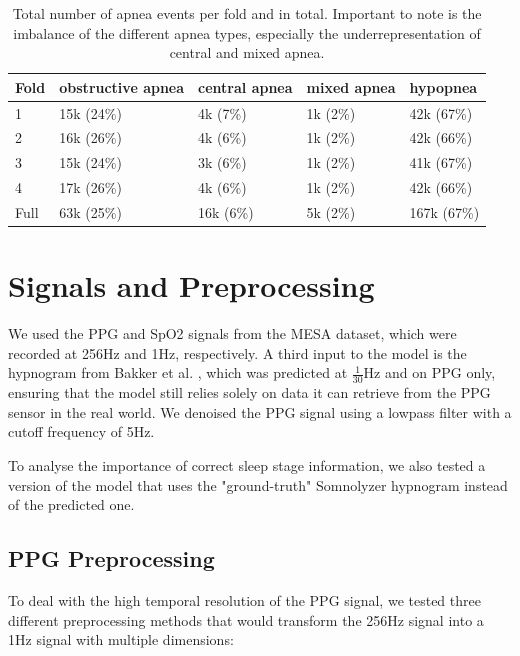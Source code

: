 \renewcommand{\arraystretch}{1.5}
\begin{table}
    \centering
    \begin{tabular}{p{1cm} p{1.7cm} p{1.7cm} p{1.7cm} p{1.8cm}}
        Fold & obstructive \newline apnea & central \newline apnea & mixed \newline apnea & hypopnea \\
        \hline
        1 & 15k (24\%) & 4k (7\%) & 1k (2\%) & 42k (67\%) \\
        2 & 16k (26\%) & 4k (6\%) & 1k (2\%) & 42k (66\%) \\
        3 & 15k (24\%) & 3k (6\%) & 1k (2\%) & 41k (67\%) \\
        4 & 17k (26\%) & 4k (6\%) & 1k (2\%) & 42k (66\%) \\
        \hline
        Full & 63k (25\%) & 16k (6\%) & 5k (2\%) & 167k (67\%) \\
    \end{tabular}
    \caption{Total number of apnea events per fold and in total. Important to note is the imbalance of the different apnea types, especially the underrepresentation of central and mixed apnea. \label{tab:dataset-apnea-classes}}
\end{table}

\section{Signals and Preprocessing}

We used the PPG and SpO2 signals from the MESA dataset, which were recorded at 256Hz and 1Hz, respectively. A third input to the model is the hypnogram from Bakker et al. \cite{bakker2021estimating}, which was predicted at $\frac{1}{30}$Hz and on PPG only, ensuring that the model still relies solely on data it can retrieve from the PPG sensor in the real world.
We denoised the PPG signal using a lowpass filter with a cutoff frequency of 5Hz.

To analyse the importance of correct sleep stage information, we also tested a version of the model that uses the "ground-truth" Somnolyzer hypnogram instead of the predicted one.

\subsection*{PPG Preprocessing}

To deal with the high temporal resolution of the PPG signal, we tested three different preprocessing methods that would transform the 256Hz signal into a 1Hz signal with multiple dimensions:

